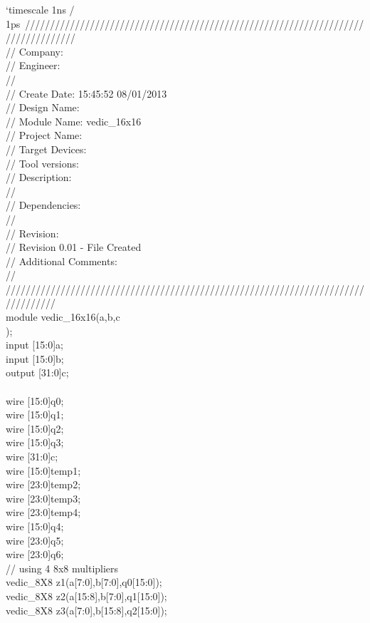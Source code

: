 `timescale 1ns / 1ps\
//////////////////////////////////////////////////////////////////////////////////\\
// Company: \\
// Engineer: \\
// \\
// Create Date:    15:45:52 08/01/2013 \\
// Design Name: \\
// Module Name:    vedic\_16x16 \\
// Project Name: \\
// Target Devices: \\
// Tool versions: \\
// Description: \\
//\\
// Dependencies: \\
//\\
// Revision: \\
// Revision 0.01 - File Created\\
// Additional Comments: \\
//\\
//////////////////////////////////////////////////////////////////////////////////\\
module vedic\_16x16(a,b,c\\
    );\\
input [15:0]a;\\
input [15:0]b;\\
output [31:0]c;\\
\\
wire [15:0]q0;	\\
wire [15:0]q1;	\\
wire [15:0]q2;\\
wire [15:0]q3;	\\
wire [31:0]c;\\
wire [15:0]temp1;\\
wire [23:0]temp2;\\
wire [23:0]temp3;\\
wire [23:0]temp4;\\
wire [15:0]q4;\\
wire [23:0]q5;\\
wire [23:0]q6;\\
// using 4 8x8 multipliers\\
vedic\_8X8 z1(a[7:0],b[7:0],q0[15:0]);\\
vedic\_8X8 z2(a[15:8],b[7:0],q1[15:0]);\\
vedic\_8X8 z3(a[7:0],b[15:8],q2[15:0]);\\
